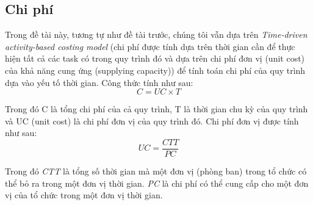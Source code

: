 \subsection{Chi phí}
Trong đề tài này, tương tự như đề tài trước, chúng tôi vẫn dựa trên \emph{Time-driven activity-based costing
model} (chi phí được tính dựa trên thời gian cần để thực hiện tất cả các task có trong quy trình đó và dựa trên chi phí đơn vị (unit cost) của khả năng cung ứng (supplying
capacity)) để tính toán chi phí của quy trình dựa vào yếu tố thời gian. Công thức tính như sau:
\[ C = UC \times T \]
\par
Trong đó C là tổng chi phí của cả quy trình, T là thời gian chu kỳ của quy trình và UC (unit cost) là chi phí đơn vị của quy trình đó. Chi phí đơn vị được tính như sau:
\[ UC = \frac{CTT}{PC}\]
\par
Trong đó \emph{CTT} là tổng số thời gian mà một đơn vị (phòng ban) trong tổ chức có thể bỏ ra trong một đơn vị thời gian. \emph{PC} là chi phí có thể cung cấp cho một đơn vị của tổ chức trong một đơn vị thời gian.